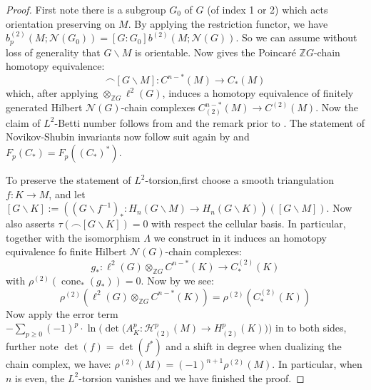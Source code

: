 \documentclass[11pt]{report}
\theoremstyle{definition}
\theoremstyle{plain}
\DeclareMathOperator{\cone}{cone}
\newcommand{\integer}{\mathbb{Z}}
\newcommand{\vna}{\mathcal{N}}
\begin{document}
\begin{proof}
	First note there is a subgroup $G_0$ of $G$ (of index 1 or 2) which acts orientation preserving on $M$. By applying the restriction functor, we have $b^{(2)}_p(M; \vna(G_0))=[G:G_0]b^{(2)}(M; \vna(G))$. So we can assume without loss of generality that $G\backslash M$ is orientable. Now \cite[Theorem~2.1]{wall1999} gives the Poincar\'e $\integer G$-chain homotopy equivalence:
	\begin{equation}
	\frown[G\backslash M]: C^{n-*}(M)\to C_*(M)
	\end{equation}
	which, after applying $\otimes_{\integer G}\ell^2(G)$, induces a homotopy equivalence of finitely generated Hilbert $\vna(G)$-chain complexes $C^{n-*}_{(2)}(M)\to C^{(2)}(M)$. Now the claim of $L^2$-Betti number follows from  and the remark prior to . The statement of Novikov-Shubin invariants now follow suit again by  and $F_p(C_*)=F_p((C_*)^*)$.
	\par To preserve the statement of $L^2$-torsion,first choose a smooth triangulation $f:K \to M$, and let $[G\backslash K]:=((G\backslash f^{-1})_*:H_n(G\backslash M)\to H_n(G\backslash K))([G\backslash M])$. Now \cite[Theorem~2.1]{wall1999} also asserts $\tau(\frown[G\backslash K])=0$ with respect the cellular basis. In particular, together with the isomorphism $\Lambda$ we construct in  it induces an homotopy equivalence fo finite Hilbert $\vna(G)$-chain complexes:
	\begin{equation*}
	g_*:\ell^2(G)\otimes_{\integer G} C^{n-*}(K)\to C_*^{(2)}(K)
	\end{equation*}
	with $\rho^{(2)}(\cone_*(g_*))=0$. Now by  we see:
	\begin{equation}
	\rho^{(2)}(\ell^2(G)\otimes_{\integer G} C^{n-*}(K))=\rho^{(2)}(C_*^{(2)}(K))
	\end{equation}
	Now apply the error term $-\sum_{p \geq 0}(-1)^p\cdot \ln\Bigg(\det\big(A_K^p:\mathcal{H}^p_{(2)}(M)\to H^p_{(2)}(K)\big)\Bigg)$ in  to both sides, further note $\det(f)=\det(f^*)$ and a shift in degree when dualizing the chain complex, we have: $\rho^{(2)}(M)=(-1)^{n+1}\rho^{(2)}(M)$. In particular, when $n$ is even, the $L^2$-torsion vanishes and we have finished the proof.
\end{proof}
\end{document}
